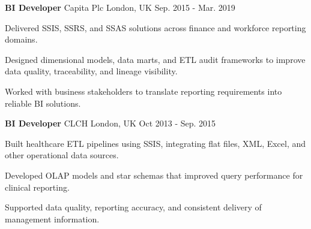 \begin{cventries}
  \cventry
  {\textbf{BI Developer}} %
  {{\color{awesome-nephritis}Capita Plc} } %
  {London, UK} %
  {Sep. 2015 - Mar. 2019} %
  {
    \begin{cvitems} %
    \item {Delivered SSIS, SSRS, and SSAS solutions across finance and workforce reporting domains.}
    \item {Designed dimensional models, data marts, and ETL audit frameworks to improve data quality, traceability, and lineage visibility.}
    \item {Worked with business stakeholders to translate reporting requirements into reliable BI solutions.}
    \end{cvitems}
  }

  \cventry
  {\textbf{BI Developer}} %
  {{\color{awesome-nephritis}CLCH} } %
  {London, UK} %
  {Oct 2013 - Sep. 2015} %
  {
    \begin{cvitems} %
    \item{Built healthcare ETL pipelines using SSIS, integrating flat files, XML, Excel, and other operational data sources.}
    \item{Developed OLAP models and star schemas that improved query performance for clinical reporting.}
    \item{Supported data quality, reporting accuracy, and consistent delivery of management information.}
    \end{cvitems}
  }
\end{cventries}
